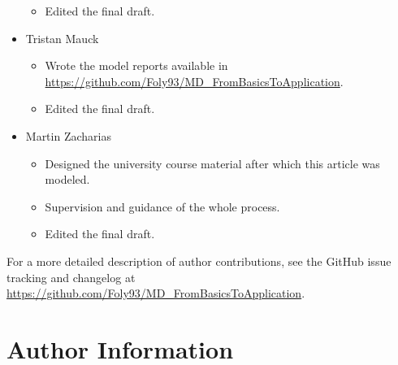 \documentclass[9pt,tutorial]{livecoms}
\newcommand{\githubrepository}{\url{https://github.com/Foly93/MD_FromBasicsToApplication}}
\begin{document}
\begin{itemize}
\begin{itemize}
        \item Edited the final draft.
    \end{itemize}\endgroup
    \item Tristan Mauck
    \begin{itemize}\begingroup\fontsize{7pt}{7pt}\selectfont
        \item Wrote the model reports available in \githubrepository.
        \item Edited the final draft.
    \end{itemize}\endgroup
    \item Martin Zacharias 
    \begin{itemize}\begingroup\fontsize{7pt}{7pt}\selectfont
        \item Designed the university course material after which this article was modeled.
        \item Supervision and guidance of the whole process.
        \item Edited the final draft.
    \end{itemize}\endgroup
\end{itemize}
For a more detailed description of author contributions,
see the GitHub issue tracking and changelog at \githubrepository.

\section*{Author Information}
\makeorcid


\end{document}
